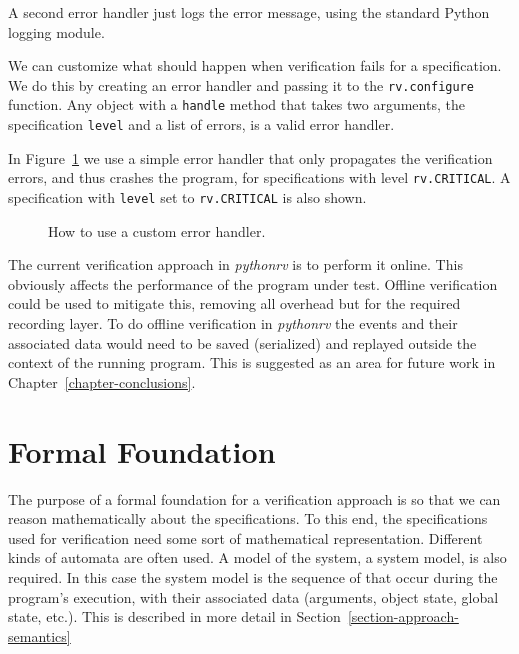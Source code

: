 A second error handler just logs the error message, using the standard Python
logging module.

We can customize what should happen when verification fails for a
specification. We do this by creating an error handler and passing it to the
\texttt{rv.configure} function. Any object with a \texttt{handle} method that
takes two arguments, the specification \texttt{level} and a list of errors, is
a valid error handler.

In Figure~\ref{figure-configure-error-handler} we use a simple error handler
that only propagates the verification errors, and thus crashes the program, for
specifications with level \texttt{rv.CRITICAL}. A specification with
\texttt{level} set to \texttt{rv.CRITICAL} is also shown.

\begin{figure}[h!]
	\begin{center}
	\begin{minipage}{0.7\textwidth}
	
	\end{minipage}
	\end{center}

  \caption{How to use a custom error handler.}
	\label{figure-configure-error-handler}
\end{figure}

The current verification approach in \textit{pythonrv} is to perform it online.
This obviously affects the performance of the program under test. Offline
verification could be used to mitigate this, removing all overhead but for the
required recording layer. To do offline verification in \textit{pythonrv} the
events and their associated data would need to be saved (serialized) and
replayed outside the context of the running program. This is suggested as an
area for future work in Chapter~\ref{chapter-conclusions}.






\section{Formal Foundation} \label{section-approach-formal-foundation}

The purpose of a formal foundation for a verification approach is so that we
can reason mathematically about the specifications. To this end, the
specifications used for verification need some sort of mathematical
representation. Different kinds of automata are often used. A model of the
system, a system model, is also required. In this case the system model is the
sequence of that occur during the program's execution, with their associated
data (arguments, object state, global state, etc.). This is described in more
detail in Section~\ref{section-approach-semantics}

